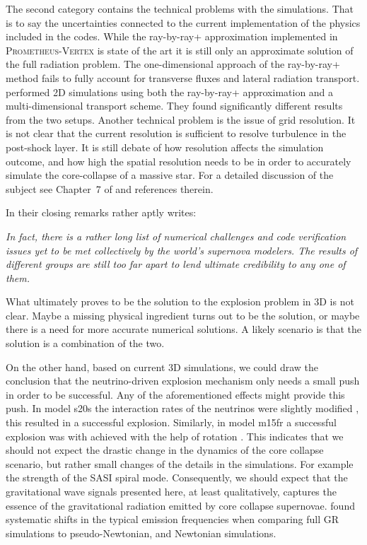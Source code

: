 The second category contains the technical problems with the simulations. That is to say the uncertainties connected to the current implementation of the physics included in the codes. 
While the ray-by-ray+ approximation implemented in \textsc{Prometheus-Vertex} \citep{rampp_02} is state of the art it is still only an approximate
solution of the full radiation problem. The one-dimensional approach of the ray-by-ray+ method fails to fully account for
transverse fluxes and lateral radiation transport. \cite{skinner_16} performed 2D simulations using both the ray-by-ray+ approximation and a multi-dimensional transport scheme. They found significantly different results from the two setups.
Another technical problem is the issue of grid resolution. It is not clear that the current resolution is sufficient to resolve turbulence in the post-shock layer. It is still debate of how resolution affects the simulation outcome, and
how high the spatial resolution needs to be in order to accurately simulate the core-collapse of a massive star. For a detailed discussion
of the subject see Chapter~7 of \cite{melson_phd} and references therein. 

In their closing remarks \cite{skinner_16} rather aptly writes:
\begin{displayquote}
\textit{In fact, there is a rather long list of numerical
challenges and code verification issues yet to be met
collectively by the world’s supernova modelers. The results
of different groups are still too far apart to lend ultimate
credibility to any one of them.} 
\end{displayquote}
What ultimately proves to be the solution to the explosion problem in 3D is not clear. Maybe a
missing physical ingredient turns out to be the solution, or maybe there is a need for
more accurate numerical solutions. A likely scenario is that the solution is
a combination of the two. 

On the other hand, based on current 3D simulations, we could draw the conclusion that the neutrino-driven explosion mechanism only needs a small push in order to be successful. Any of the aforementioned effects might provide this push. 
In model s20s the interaction rates of the neutrinos were slightly modified \citep{melson_15b}, this resulted in a successful explosion. 
Similarly, in model m15fr a successful explosion was with achieved with the help of rotation \citep{suma_models}. 
This indicates that we should not expect the drastic change in the dynamics of the core collapse scenario, 
but rather small changes of the details in the simulations. For example the strength of the SASI spiral mode. 
Consequently, we should expect that the gravitational wave signals presented here, at least qualitatively, 
captures the essence of the gravitational radiation emitted by core collapse supernovae. \cite{mueller_13} found systematic
shifts in the typical emission frequencies when comparing full GR simulations to pseudo-Newtonian, and Newtonian simulations.


